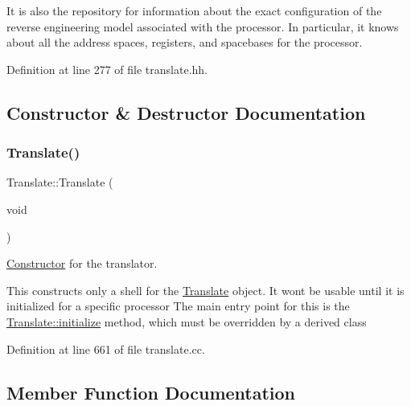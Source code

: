 It is also the repository for information about the exact configuration of the reverse engineering model associated with the processor. In particular, it knows about all the address spaces, registers, and spacebases for the processor. 

Definition at line 277 of file translate.\+hh.



\subsection{Constructor \& Destructor Documentation}
\mbox{\label{class_translate_a441f5adef52843f104286f5b921775cc}} 
\subsubsection{\texorpdfstring{Translate()}{Translate()}}
{\footnotesize\ttfamily Translate\+::\+Translate (\begin{DoxyParamCaption}\item[{void}]{ }\end{DoxyParamCaption})}



\mbox{\hyperlink{class_constructor}{Constructor}} for the translator. 

This constructs only a shell for the \mbox{\hyperlink{class_translate}{Translate}} object. It won\textquotesingle{}t be usable until it is initialized for a specific processor The main entry point for this is the \mbox{\hyperlink{class_translate_af8e71e9a9477e9a91be400ecca565df5}{Translate\+::initialize}} method, which must be overridden by a derived class 

Definition at line 661 of file translate.\+cc.



\subsection{Member Function Documentation}
\mbox{\label{class_translate_a2614aefa5c03a9f1ed0b2dba794cad2c}} 
